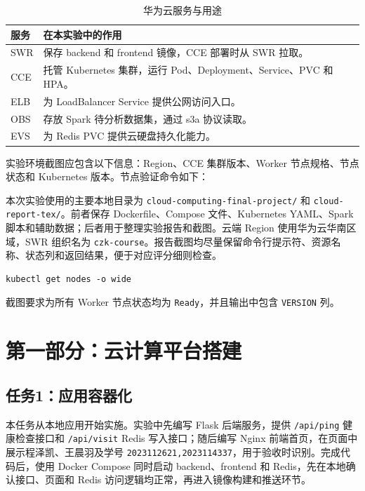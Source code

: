 \documentclass[bwprint]{report}
\begin{document}
\begin{table}[!htbp]
    \centering
    \caption{华为云服务与用途}
    \begin{tabularx}{\textwidth}{lX}
        \toprule[1.5pt]
        服务 & 在本实验中的作用 \\
        \midrule[1pt]
        SWR & 保存 backend 和 frontend 镜像，CCE 部署时从 SWR 拉取。 \\
        CCE & 托管 Kubernetes 集群，运行 Pod、Deployment、Service、PVC 和 HPA。 \\
        ELB & 为 LoadBalancer Service 提供公网访问入口。 \\
        OBS & 存放 Spark 待分析数据集，通过 s3a 协议读取。 \\
        EVS & 为 Redis PVC 提供云硬盘持久化能力。 \\
        \bottomrule[1.5pt]
    \end{tabularx}
\end{table}

实验环境截图应包含以下信息：Region、CCE 集群版本、Worker 节点规格、节点状态和 Kubernetes 版本。节点验证命令如下：

本次实验使用的主要本地目录为 \texttt{cloud-computing-final-project/} 和 \texttt{cloud-report-tex/}。前者保存 Dockerfile、Compose 文件、Kubernetes YAML、Spark 脚本和辅助数据；后者用于整理实验报告和截图。云端 Region 使用华为云华南区域，SWR 组织名为 \texttt{czk-course}。报告截图均尽量保留命令行提示符、资源名称、状态列和返回结果，便于对应评分细则检查。

\begin{lstlisting}[style=shellstyle]
kubectl get nodes -o wide
\end{lstlisting}

截图要求为所有 Worker 节点状态均为 \texttt{Ready}，并且输出中包含 \texttt{VERSION} 列。

\section{第一部分：云计算平台搭建}

\subsection{任务1：应用容器化}

本任务从本地应用开始实施。实验中先编写 Flask 后端服务，提供 \texttt{/api/ping} 健康检查接口和 \texttt{/api/visit} Redis 写入接口；随后编写 Nginx 前端首页，在页面中展示程泽凯、王晨羽及学号 \texttt{2023112621,2023114337}，用于验收时识别。完成代码后，使用 Docker Compose 同时启动 backend、frontend 和 Redis，先在本地确认接口、页面和 Redis 访问逻辑均正常，再进入镜像构建和推送环节。
\end{document}
